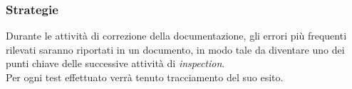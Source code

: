 \subsubsection{Strategie}
Durante le attività di correzione della documentazione, gli errori più frequenti rilevati saranno riportati in un documento, in modo tale da diventare uno dei punti chiave delle successive attività di \textit{inspection}.\\
Per ogni test effettuato verrà tenuto tracciamento del suo esito.